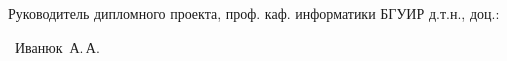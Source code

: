{  \vfill
  \noindent
  \begin{minipage}{0.50\textwidth}
    \begin{flushleft}
      Руководитель дипломного проекта,
      проф. каф. информатики БГУИР
      д.т.н., доц.:
    \end{flushleft}
  \end{minipage}
  \begin{minipage}{0.44\textwidth}
    \begin{flushright}
      \bigskip
      \underline{\hspace*{3cm}}~Иванюк~А.\,А.
    \end{flushright}
  \end{minipage}
}

\clearpage
